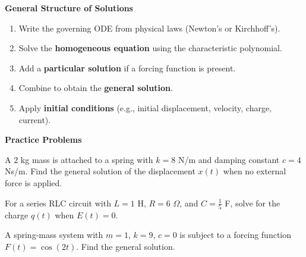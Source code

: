     \textbf{General Structure of Solutions}
    \begin{enumerate}
      \item Write the governing ODE from physical laws (Newton’s or Kirchhoff’s).
      \item Solve the \textbf{homogeneous equation} using the characteristic polynomial.
      \item Add a \textbf{particular solution} if a forcing function is present.
      \item Combine to obtain the \textbf{general solution}.
      \item Apply \textbf{initial conditions} (e.g., initial displacement, velocity, charge, current).
    \end{enumerate}


  \textbf{Practice Problems}
    \begin{question}
      A $2$ kg mass is attached to a spring with $k=8$ N/m and damping constant $c=4$ Ns/m.  
      Find the general solution of the displacement $x(t)$ when no external force is applied.
    \end{question}

    \begin{question}
      For a series RLC circuit with $L=1$ H, $R=6$ $\Omega$, and $C=\tfrac{1}{5}$ F, solve for the charge $q(t)$ when $E(t)=0$.
    \end{question}

    \begin{question}
      A spring-mass system with $m=1$, $k=9$, $c=0$ is subject to a forcing function $F(t)=\cos(2t)$.  
      Find the general solution.
    \end{question}

